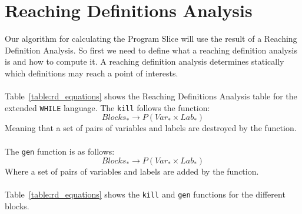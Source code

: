\section{Reaching Definitions Analysis}
Our algorithm for calculating the Program Slice will use the result of a Reaching Definition Analysis. So first we need to define what a reaching definition analysis is and how to compute it. A reaching definition analysis determines statically which definitions may reach a point of interests.
\\\\
Table~\ref{table:rd_equations} shows the Reaching Definitions Analysis table for the extended \texttt{WHILE} language. The \texttt{kill} follows the function:
\begin{equation}
	Blocks_{*}\rightarrow P(Var_{*}\times Lab_{*})
\end{equation}
Meaning that a set of pairs of variables and labels are destroyed by the function.
\\\\
The \texttt{gen} function is as follows:
\begin{equation}
	Blocks_{*}\rightarrow P(Var_{*}\times Lab_{*})
\end{equation}
Where a set of pairs of variables and labels are added by the function.
\\\\
Table~\ref{table:rd_equations} shows the \texttt{kill} and \texttt{gen} functions for the different blocks.
